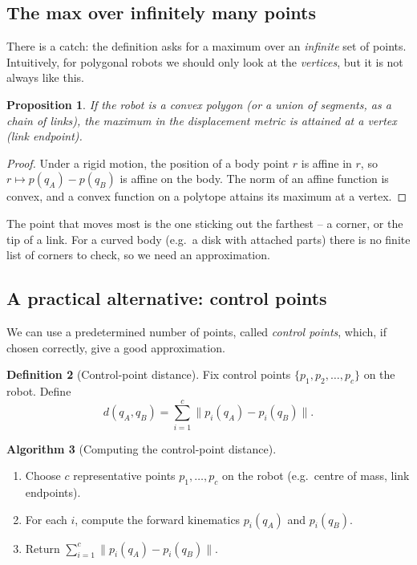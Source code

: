 \documentclass[11pt,a4paper]{article}
\newcommand{\norm}[1]{\lVert #1\rVert}
\theoremstyle{definition}
\newtheorem{definition}{Definition}[section]
\newtheorem{algorithm}[definition]{Algorithm}
\theoremstyle{plain}
\newtheorem{proposition}[definition]{Proposition}
\begin{document}
\subsection{The max over infinitely many points}

There is a catch: the definition asks for a maximum over an \emph{infinite} set of points. Intuitively, for polygonal robots we should only look at the \emph{vertices}, but it is not always like this.

\begin{proposition}
If the robot is a convex polygon (or a union of segments, as a chain of links), the maximum in the displacement metric is attained at a vertex (link endpoint).
\end{proposition}

\begin{proof}
Under a rigid motion, the position of a body point $r$ is affine in $r$, so $r\mapsto p(q_A)-p(q_B)$ is affine on the body. The norm of an affine function is convex, and a convex function on a polytope attains its maximum at a vertex.
\end{proof}

\begin{intuition}
The point that moves most is the one sticking out the farthest -- a corner, or the tip of a link. For a curved body (e.g.\ a disk with attached parts) there is no finite list of corners to check, so we need an approximation.
\end{intuition}

\subsection{A practical alternative: control points}

We can use a predetermined number of points, called \emph{control points}, which, if chosen correctly, give a good approximation.

\begin{definition}[Control-point distance]
Fix control points $\{p_1,p_2,\dots,p_c\}$ on the robot. Define
\[
  d(q_A,q_B)=\sum_{i=1}^{c}\norm{p_i(q_A)-p_i(q_B)} .
\]
\end{definition}

\begin{algorithm}[Computing the control-point distance]
\begin{enumerate}[nosep]
  \item Choose $c$ representative points $p_1,\dots,p_c$ on the robot (e.g.\ centre of mass, link endpoints).
  \item For each $i$, compute the forward kinematics $p_i(q_A)$ and $p_i(q_B)$.
  \item Return $\sum_{i=1}^c\norm{p_i(q_A)-p_i(q_B)}$.
\end{enumerate}
\end{algorithm}
\end{document}
